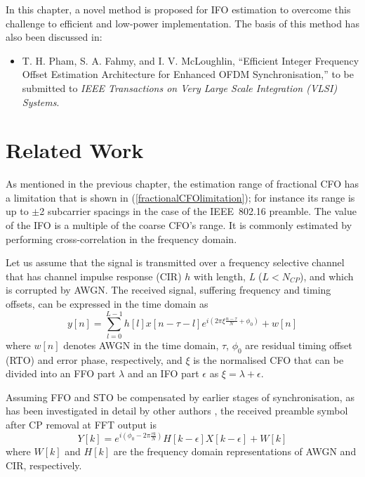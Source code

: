 In this chapter, a novel method is proposed for IFO estimation to overcome this challenge to efficient and low-power implementation. The basis of this method has also been discussed in:
\begin{itemize}
\item T. H. Pham, S. A. Fahmy, and I. V. McLoughlin, ``Efficient Integer Frequency Offset Estimation Architecture for Enhanced OFDM Synchronisation,'' to be submitted to \textit{IEEE Transactions on Very Large Scale Integration (VLSI) Systems}.
\end{itemize}

\section{Related Work}
As mentioned in the previous chapter, the estimation range of  fractional CFO has a limitation that is shown in (\ref{fractionalCFOlimitation}); for instance its range is up to $\pm$2 subcarrier spacings in the case of the IEEE~802.16 preamble. The value of the IFO is a multiple of the coarse CFO's range.
It is commonly estimated by performing cross-correlation \cite{Bang2001,Kim2008} in the frequency domain.

Let us assume that the signal is transmitted over a frequency selective channel that has channel impulse response (CIR) $h$ with length, \emph{L} ($L<N_{CP}$), and which is corrupted by AWGN.
The received signal, suffering frequency and timing offsets, can be expressed in the time domain as
\begin{equation}
\label{xnfull}
y[n] = \sum_{l=0}^{L-1} h[l]x[n-\tau-l] e^{i(2\pi \xi \frac{n-\tau}{N} + \phi_0)} + w[n]
\end{equation}
where $w[n]$ denotes AWGN in the time domain, $\tau$, $\phi_0$ are residual timing offset (RTO) and error phase, respectively, and $\xi$ is the normalised CFO that can be divided into an FFO part $\lambda$ and an IFO part $\epsilon$ as $\xi=\lambda+\epsilon$.

Assuming FFO and STO be compensated by earlier stages of synchronisation, as has been investigated in detail by other authors \cite{Kim2008,Pham2014}, the received preamble symbol after CP removal at FFT output is
\begin{equation}
\label{xnrec}
Y[k] =  e^{i(\phi_0-2\pi \frac{\tau k}{N})} H[k-\epsilon] X[k-\epsilon] + W[k]
\end{equation}
where $W[k]$ and $H[k]$ are the frequency domain representations of AWGN and CIR, respectively.

